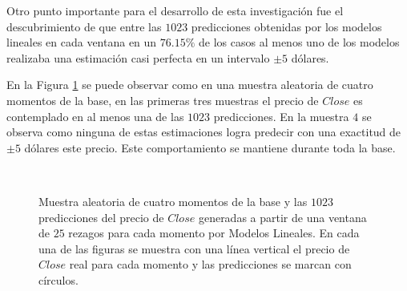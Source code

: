 \documentclass[a4paper,12pt,twocolumn]{article}
\begin{document}
Otro punto importante para el desarrollo de esta investigación fue el descubrimiento de que entre las $1023$ predicciones obtenidas por los modelos lineales en cada ventana en un  $76.15\%$ de los casos al menos uno de los modelos realizaba una estimación casi perfecta en un intervalo $\pm 5$ dólares. 

En la Figura \ref{muestras} se puede observar como en una muestra aleatoria de cuatro momentos de la base, en las primeras tres muestras el precio de $Close$ es contemplado en al menos una de las $1023$ predicciones. En la muestra $4$ se observa como ninguna de estas estimaciones logra predecir con una exactitud de $\pm 5$ dólares este precio. Este comportamiento se mantiene durante toda la base.

\begin{figure}[!htb]
\centering
{}\\
\hfill
{}\hfill
{}
\caption{Muestra aleatoria de cuatro momentos de la base y las $1023$ predicciones del precio de $Close$ generadas a partir de una ventana de $25$ rezagos para cada momento por Modelos Lineales. En cada una de las figuras se muestra con una línea vertical el precio de $Close$ real para cada momento y las predicciones se marcan con círculos.}
\label{muestras}
\end{figure}
%
\end{document}
